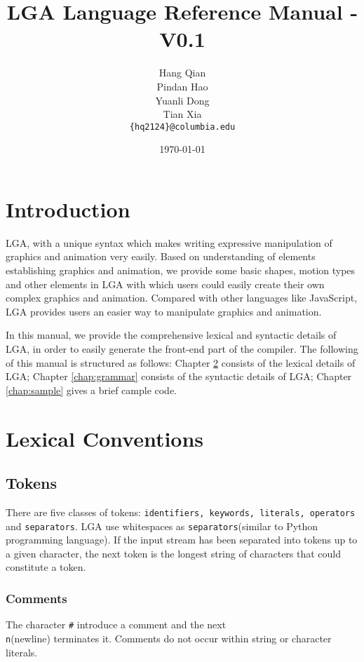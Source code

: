 \documentclass[10pt]{report}
\title{\textbf{LGA Language Reference Manual - V0.1}}
\author{ Hang Qian \\ Pindan Hao \\ Yuanli Dong \\ Tian Xia \\ \texttt{\{hq2124\}@columbia.edu}}
\date{\today}
\begin{document}
\maketitle
\tableofcontents

\newpage

\chapter{Introduction}
\label{chap:intro}

LGA, with a unique syntax which makes writing expressive manipulation of graphics and animation very easily. Based on understanding of elements establishing graphics and animation, we provide some basic shapes, motion types and other elements in LGA with which users could easily create their own complex graphics and animation. Compared with other languages like JavaScript, LGA provides users an easier way to manipulate graphics and animation.

In this manual, we provide the comprehensive lexical and syntactic details of LGA, in order to easily generate the front-end part of the compiler. The following of this manual is structured as follows: Chapter \ref{chap:lex} consists of the lexical details of LGA; Chapter \ref{chap:grammar} consists of the syntactic details of LGA; Chapter \ref{chap:sample} gives a brief cample code.

\chapter{Lexical Conventions}
\label{chap:lex}


\section{Tokens}
\label{sec:token}

There are five classes of tokens: \texttt{identifiers, keywords, literals, operators} and \texttt{separators}. LGA use whitespaces as \texttt{separators}(similar to Python programming language). If the input stream has been separated into tokens up to a given character, the next token is the longest string of characters that could constitute a token.

\subsection{Comments}
\label{sec:comments}

The character \texttt{\#} introduce a comment and the next \texttt{\\n}(newline) terminates it. Comments do not occur within string or character literals.
\end{document}
